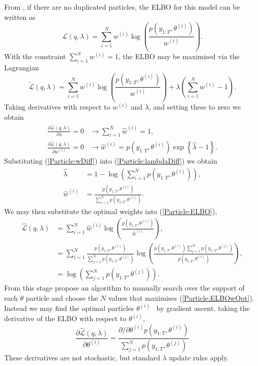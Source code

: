 \documentclass[
12pt, %
onehalfspacing, %
nohyperref, %
headsepline, %
chapterinoneline, %
]{MastersDoctoralThesis} %
\begin{document}
From \cite{Saeedi2015}, if there are no duplicated particles, the ELBO for this model can be written as
\begin{equation}
\label{Particle:ELBO}
\mathcal{L}(q, \lambda) = \sum_{i=1}^N w^{(i)} \log \left( \frac{p\left(y_{1:T}, \theta^{(i)}\right)}{w^{(i)}} \right).
\end{equation}
With the constraint $\sum_{i=1}^N w^{(i)} = 1$, the ELBO may be maximised via the Lagrangian
\begin{equation}
\label{Particle:ELBOlagr}
\tilde{\mathcal{L}}(q, \lambda) = \sum_{i=1}^N w^{(i)} \log \left( \frac{p\left(y_{1:T}, \theta^{(i)}\right)}{w^{(i)}} \right) + \lambda\left(\sum_{i=1}^N w^{(i)} - 1\right).
\end{equation}
Taking derivatives with respect to $w^{(i)}$ and $\lambda$, and setting these to zero we obtain
\begin{align}
\frac{\partial \tilde{\mathcal{L}}(q, \lambda)}{\partial \lambda} = 0 &\rightarrow \sum_{i=1}^N \hat{w}^{(i)} = 1, \label{Particle:lambdaDiff} \\
\frac{\partial \tilde{\mathcal{L}}(q, \lambda)}{\partial w^{(i)}} = 0 &\rightarrow \hat{w}^{(i)} = p\left(y_{1:T}, \theta^{(i)}\right) \exp\left\{\hat{\lambda} - 1\right\}. \label{Particle:wDiff} 
\end{align}
Substituting (\ref{Particle:wDiff}) into (\ref{Particle:lambdaDiff}) we obtain
\begin{align}
\hat{\lambda} &= 1 - \log\left(\sum_{i=1}^N p\left(y_{1:T}, \theta^{(i)}\right) \right), \\
\hat{w}^{(i)} &= \frac{p\left(y_{1:T}, \theta^{(i)}\right)}{\sum_{i=1}^N p\left(y_{1:T}, \theta^{(i)}\right)}.
\end{align}
We may then substitute the optimal weights into (\ref{Particle:ELBO}),
\begin{align}
\hat{\mathcal{L}}(q, \lambda) &= \sum_{i=1}^N \hat{w}^{(i)} \log \left( \frac{p\left(y_{1:T}, \theta^{(i)}\right)}{\hat{w}^{(i)}} \right), \nonumber \\
 &= \sum_{i=1}^N \frac{p\left(y_{1:T}, \theta^{(i)}\right)}{\sum_{j=1}^N p\left(y_{1:T}, \theta^{(j)}\right)} \log \left( \frac{p\left(y_{1:T}, \theta^{(i)}\right)\sum_{j=1}^N p\left(y_{1:T}, \theta^{(j)}\right)}{p\left(y_{1:T}, \theta^{(i)}\right)} \right), \nonumber \\
 &= \log \left( \sum_{j=1}^N p\left(y_{1:T}, \theta^{(j)}\right) \right). \label{Particle:ELBOwOpt}
\end{align}
From this stage \cite{Saeedi2015} propose an algorithm to manually search over the support of each $\theta$ particle and choose the $N$ values that maximises (\ref{Particle:ELBOwOpt}). Instead we may find the optimal particles $\theta^{(i)}$ \ by gradient ascent, taking the derivative of the ELBO with respect to $\theta^{(i)}$,
\begin{equation}
\label{Particle:thetaDiff}
\frac{\partial \hat{\mathcal{L}}(q, \lambda)}{\partial \theta^{(i)}}
= \frac{\partial / \partial \theta^{(i)} p\left(y_{1:T}, \theta^{(i)}\right)}{\sum_{j=1}^N p\left(y_{1:T}, \theta^{(j)}\right)}
\end{equation}
These derivatives are not stochastic, but standard $\lambda$ update rules apply.
\\
\end{document}
